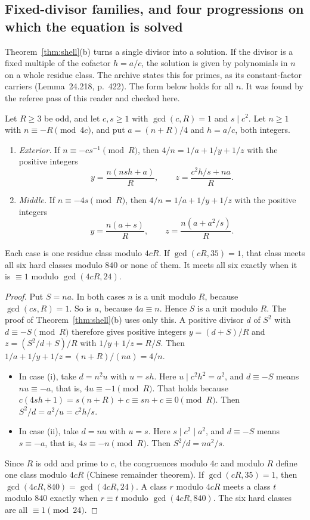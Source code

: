\subsection{Fixed-divisor families, and four progressions on which the equation is solved}\label{ssec:families}

Theorem~\ref{thm:shell}(b) turns a single divisor into a solution. If the divisor is a fixed multiple of the cofactor $h=a/c$, the solution is given by polynomials in $n$ on a whole residue class. The archive states this for primes, as its constant-factor carriers (Lemma~24.218, p.~422). The form below holds for all $n$. It was found by the referee pass of this reader and checked here.

\begin{proposition}\label{prop:fixeddivisor}
Let $R\ge3$ be odd, and let $c,s\ge1$ with $\gcd(c,R)=1$ and $s\mid c^2$. Let $n\ge1$ with $n\equiv-R\pmod{4c}$, and put $a=(n+R)/4$ and $h=a/c$, both integers.
\begin{enumerate}[label=(\roman*)]
\item \emph{Exterior.} If $n\equiv-cs^{-1}\pmod R$, then $4/n=1/a+1/y+1/z$ with the positive integers
\[
y=\frac{n(nsh+a)}R,\qquad z=\frac{c^2h/s+na}R .
\]
\item \emph{Middle.} If $n\equiv-4s\pmod R$, then $4/n=1/a+1/y+1/z$ with the positive integers
\[
y=\frac{n(a+s)}R,\qquad z=\frac{n(a+a^2/s)}R .
\]
\end{enumerate}
Each case is one residue class modulo $4cR$. If $\gcd(cR,35)=1$, that class meets all six hard classes modulo $840$ or none of them. It meets all six exactly when it is $\equiv1$ modulo $\gcd(4cR,24)$.
\end{proposition}
\begin{proof}
Put $S=na$. In both cases $n$ is a unit modulo $R$, because $\gcd(cs,R)=1$. So is $a$, because $4a\equiv n$. Hence $S$ is a unit modulo $R$. The proof of Theorem~\ref{thm:shell}(b) uses only this. A positive divisor $d$ of $S^2$ with $d\equiv-S\pmod R$ therefore gives positive integers $y=(d+S)/R$ and $z=(S^2/d+S)/R$ with $1/y+1/z=R/S$. Then $1/a+1/y+1/z=(n+R)/(na)=4/n$.
\begin{itemize}
\item In case (i), take $d=n^2u$ with $u=sh$. Here $u\mid c^2h^2=a^2$, and $d\equiv-S$ means $nu\equiv-a$, that is, $4u\equiv-1\pmod R$. That holds because $c(4sh+1)=s(n+R)+c\equiv sn+c\equiv0\pmod R$. Then $S^2/d=a^2/u=c^2h/s$.
\item In case (ii), take $d=nu$ with $u=s$. Here $s\mid c^2\mid a^2$, and $d\equiv-S$ means $s\equiv-a$, that is, $4s\equiv-n\pmod R$. Then $S^2/d=na^2/s$.
\end{itemize}
Since $R$ is odd and prime to $c$, the congruences modulo $4c$ and modulo $R$ define one class modulo $4cR$ (Chinese remainder theorem). If $\gcd(cR,35)=1$, then $\gcd(4cR,840)=\gcd(4cR,24)$. A class $r$ modulo $4cR$ meets a class $t$ modulo $840$ exactly when $r\equiv t$ modulo $\gcd(4cR,840)$. The six hard classes are all $\equiv1\pmod{24}$.
\end{proof}

